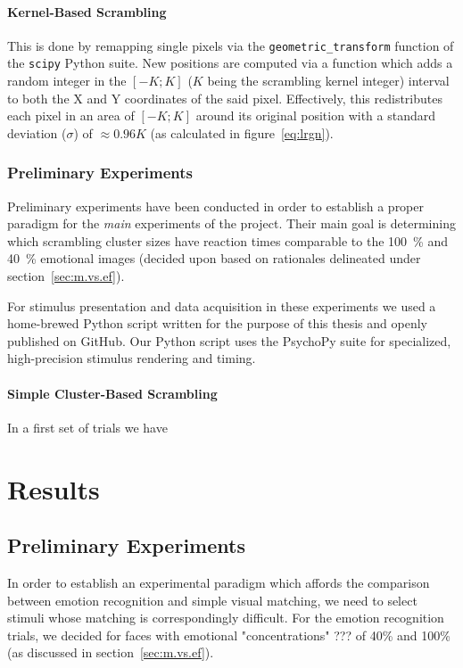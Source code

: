 	    \subsubsection{Kernel-Based Scrambling}\label{sec:m.vs.si.kbs}
	    This is done by remapping single pixels via the \colorbox{vlg}{\texttt{geometric\_transform}} function of the \colorbox{vlg}{\texttt{scipy}} Python suite. 
	    New positions are computed via a function which adds a random integer in the $[-K;K]$ ($K$ being the scrambling kernel integer) interval to both the X and Y coordinates of the said pixel.
	    Effectively, this redistributes each pixel in an area of $[-K;K]$ around its original position with a standard deviation ($\sigma$) of $\approx 0.96K$ (as calculated in figure~\ref{eq:lrgn}). 
	\subsection{Preliminary Experiments} 
	Preliminary experiments have been conducted in order to establish a proper paradigm for the \textit{main} experiments of the project. 
	Their main goal is determining which scrambling cluster sizes have reaction times comparable to the \SI{100}{\percent} and \SI{40}{\percent} emotional images (decided upon based on rationales delineated under section~\ref{sec:m.vs.ef}).
	
	For stimulus presentation and data acquisition in these experiments we used a home-brewed Python script written for the purpose of this thesis and openly published on GitHub.
	Our Python script uses the PsychoPy suite\cite{Peirce2008} for specialized, high-precision stimulus rendering and timing.   
	    \subsubsection{Simple Cluster-Based Scrambling}
	    In a first set of trials we have 
\chapter{Results}
	\section{Preliminary Experiments}\label{sec:r.pe}
	In order to establish an experimental paradigm which affords the comparison between emotion recognition and simple visual matching, we need to select stimuli whose matching is correspondingly difficult.
	For the emotion recognition trials, we decided for faces with emotional "concentrations" ??? of 40\% and 100\% (as discussed in section~\ref{sec:m.vs.ef}).
